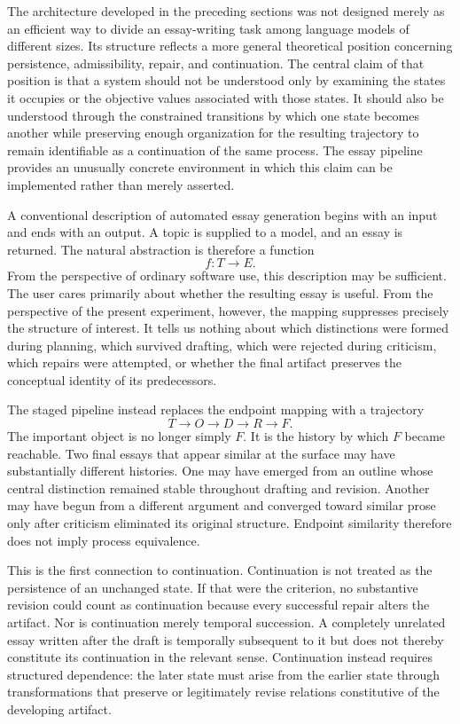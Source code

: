 \documentclass[11pt]{article}
\begin{document}
The architecture developed in the preceding sections was not designed merely as an efficient way to divide an essay-writing task among language models of different sizes. Its structure reflects a more general theoretical position concerning persistence, admissibility, repair, and continuation. The central claim of that position is that a system should not be understood only by examining the states it occupies or the objective values associated with those states. It should also be understood through the constrained transitions by which one state becomes another while preserving enough organization for the resulting trajectory to remain identifiable as a continuation of the same process. The essay pipeline provides an unusually concrete environment in which this claim can be implemented rather than merely asserted.

A conventional description of automated essay generation begins with an input and ends with an output. A topic is supplied to a model, and an essay is returned. The natural abstraction is therefore a function
\[
    f:T\rightarrow E.
\]
From the perspective of ordinary software use, this description may be sufficient. The user cares primarily about whether the resulting essay is useful. From the perspective of the present experiment, however, the mapping suppresses precisely the structure of interest. It tells us nothing about which distinctions were formed during planning, which survived drafting, which were rejected during criticism, which repairs were attempted, or whether the final artifact preserves the conceptual identity of its predecessors.

The staged pipeline instead replaces the endpoint mapping with a trajectory
\[
    T\rightarrow O\rightarrow D\rightarrow R\rightarrow F.
\]
The important object is no longer simply \(F\). It is the history by which \(F\) became reachable. Two final essays that appear similar at the surface may have substantially different histories. One may have emerged from an outline whose central distinction remained stable throughout drafting and revision. Another may have begun from a different argument and converged toward similar prose only after criticism eliminated its original structure. Endpoint similarity therefore does not imply process equivalence.

This is the first connection to continuation. Continuation is not treated as the persistence of an unchanged state. If that were the criterion, no substantive revision could count as continuation because every successful repair alters the artifact. Nor is continuation merely temporal succession. A completely unrelated essay written after the draft is temporally subsequent to it but does not thereby constitute its continuation in the relevant sense. Continuation instead requires structured dependence: the later state must arise from the earlier state through transformations that preserve or legitimately revise relations constitutive of the developing artifact.
\end{document}
